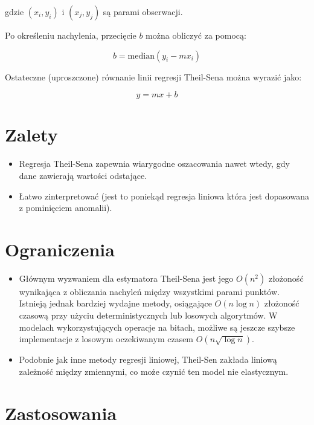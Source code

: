 gdzie $(x_i, y_i)$ i $(x_j, y_j)$ są parami obserwacji.

Po określeniu nachylenia, przecięcie $b$ można obliczyć za pomocą:

$$
b = \text{median}(y_i - m x_i)
$$


Ostateczne (uproszczone) równanie linii regresji Theil-Sena można wyrazić jako:

$$
y = mx + b
$$

{}
\section*{Zalety }
\vspace{-1.0em}
\label{sec:ml_challenges}


\begin{itemize}


\item Regresja Theil-Sena zapewnia wiarygodne oszacowania nawet wtedy, gdy dane zawierają wartości odstające.
\item Łatwo zinterpretować (jest to poniekąd regresja liniowa która jest dopasowana z pominięciem anomalii).
\end{itemize}

{}
\section*{Ograniczenia \cite{Blunck2006, cole1989optimal, Chan2010}}
\vspace{-1.0em}
\label{sec:ml_challenges}

\begin{itemize}

\item Głównym wyzwaniem dla estymatora Theil-Sena jest jego $O(n^2)$ złożoność wynikająca z obliczania nachyleń między wszystkimi parami punktów. Istnieją jednak bardziej wydajne metody, osiągające $O(n \log n)$ złożoność czasową przy użyciu deterministycznych lub losowych algorytmów. W modelach wykorzystujących operacje na bitach,  możliwe są jeszcze szybsze implementacje z losowym oczekiwanym czasem $O(n \sqrt {\log n})$.

\item Podobnie jak inne metody regresji liniowej, Theil-Sen zakłada liniową zależność między zmiennymi, co może czynić ten model nie elastycznym.
\end{itemize}

{}
\section*{Zastosowania \cite{Fernandes2005, hirsch1982techniques, vaidyanathan2005comprehensive, akritas1995theil, romanic2014long} }
\vspace{-1.0em}
\label{sec:ml_challenges}


